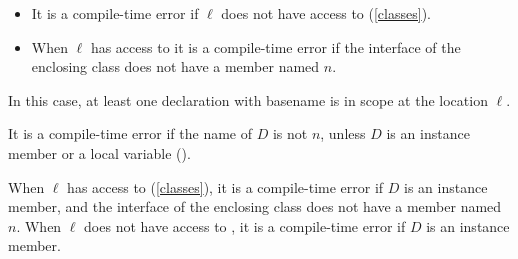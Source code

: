 \documentclass[makeidx]{article}
\begin{document}
{\begin{itemize}
\item
  It is a compile-time error if $\ell$ does not have access to \THIS{}
  (\ref{classes}).
\item
  When $\ell$ has access to \THIS{}
  it is a compile-time error if the interface of the enclosing class
  does not have a member named $n$.
\end{itemize}
\vspace{-2ex}
\EndCase

\LMHash{}%
In this case, at least one declaration with basename \id{}
is in scope at the location $\ell$.

\LMHash{}%
It is a compile-time error if the name of $D$ is not $n$,
unless $D$ is an instance member or a local variable
().

\LMHash{}%
When $\ell$ has access to \THIS{}
(\ref{classes}),
it is a compile-time error if $D$ is an instance member,
and the interface of the enclosing class does not have a member named $n$.
When $\ell$ does not have access to \THIS,
it is a compile-time error if $D$ is an instance member.
\EndCase


}
\end{document}
